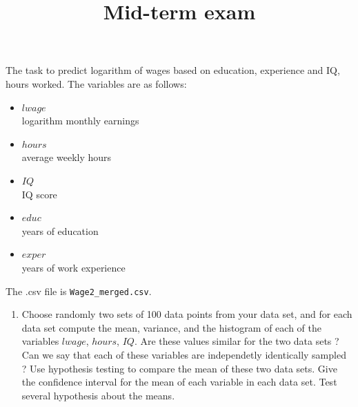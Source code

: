 \documentclass{article}
\title{Mid-term exam}
\author{}
\date{}
\begin{document}
\maketitle

   The task to predict logarithm of wages based on education, experience and IQ, hours worked. The variables are as follows:
   \begin{itemize}
   \item{$lwage$ \\}                    logarithm monthly earnings
   \item{$hours$ \\}                    average weekly hours
   \item{$IQ$ \\}                      IQ score
   \item{$educ$ \\}                     years of education
   \item{$exper$ \\}                    years of work experience
   \end{itemize}


   The .csv file is \lstinline$Wage2_merged.csv$.

  \begin{enumerate}
	 \item Choose randomly two sets of 100 data points from your data set, and for each data set compute the mean, variance, and the histogram
		 of each of the variables  $lwage$, $hours$, $IQ$. 
	Are these values similar for the two data sets ?  Can we say that each of these variables are independetly identically sampled ? 
	Use hypothesis testing to compare the mean of these two data sets. Give the confidence interval for the mean of each variable in
	each data set. 
	Test several hypothesis about the means. 
 \end{enumerate}
\end{document}
